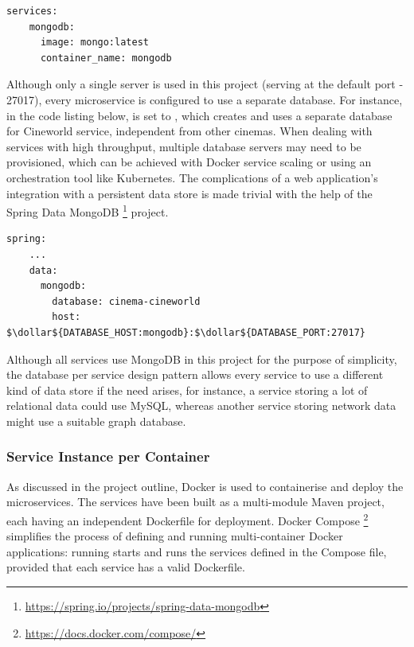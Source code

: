 \begin{lstlisting}[caption=Docker Compose file snippet for MongoDB server]
  services:
    mongodb:
      image: mongo:latest
      container_name: mongodb
\end{lstlisting}

Although only a single server is used in this project (serving at the default port - 27017), every microservice is configured to use a separate database. For instance, in the code listing below,  is set to , which creates and uses a separate database for Cineworld service, independent from other cinemas. When dealing with services with high throughput, multiple database servers may need to be provisioned, which can be achieved with Docker service scaling or using an orchestration tool like Kubernetes. The complications of a web application's integration with a persistent data store is made trivial with the help of the Spring Data MongoDB \footnote{\url{https://spring.io/projects/spring-data-mongodb}} project.

\begin{lstlisting}[caption=Snippet from Cineworld cinema's application properties]
  spring:
    ...
    data:
      mongodb:
        database: cinema-cineworld
        host: $\dollar${DATABASE_HOST:mongodb}:$\dollar${DATABASE_PORT:27017}
\end{lstlisting}

Although all services use MongoDB in this project for the purpose of simplicity, the database per service design pattern allows every service to use a different kind of data store if the need arises, for instance, a service storing a lot of relational data could use MySQL, whereas another service storing network data might use a suitable graph database.

\subsubsection{Service Instance per Container}

As discussed in the project outline, Docker is used to containerise and deploy the microservices. The services have been built as a multi-module Maven project, each having an independent Dockerfile for deployment. Docker Compose \footnote{\url{https://docs.docker.com/compose/}} simplifies the process of defining and running multi-container Docker applications: running  starts and runs the services defined in the Compose file, provided that each service has a valid Dockerfile.

